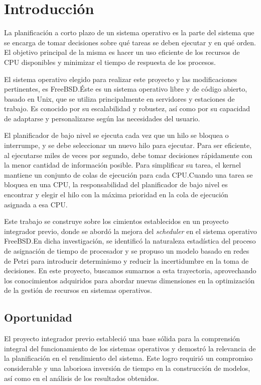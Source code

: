 \section{Introducción}
La planificación a corto plazo de un sistema operativo es la parte del sistema que se encarga de tomar decisiones sobre qué tareas se deben ejecutar y en qué orden. El objetivo principal de la misma es hacer un uso eficiente de los recursos de CPU disponibles y minimizar el tiempo de respuesta de los procesos.\par

El sistema operativo elegido para realizar este proyecto y las modificaciones pertinentes, es FreeBSD.\@ Éste es un sistema operativo libre y de código abierto, basado en Unix, que se utiliza principalmente en servidores y estaciones de trabajo. Es conocido por su escalabilidad y robustez, así como por su capacidad de adaptarse y personalizarse según las necesidades del usuario.\par

El planificador de bajo nivel se ejecuta cada vez que un hilo se bloquea o interrumpe, y se debe seleccionar un nuevo hilo para ejecutar. Para ser eficiente, al ejecutarse miles de veces por segundo, debe tomar decisiones rápidamente con la menor cantidad de información posible. Para simplificar su tarea, el kernel mantiene un conjunto de colas de ejecución para cada CPU.\@ Cuando una tarea se bloquea en una CPU, la responsabilidad del planificador de bajo nivel es encontrar y elegir el hilo con la máxima prioridad en la cola de ejecución asignada a esa CPU.\par

Este trabajo se construye sobre los cimientos establecidos en un proyecto integrador previo, donde se abordó la mejora del \textit{scheduler} en el sistema operativo FreeBSD.\@ En dicha investigación, se identificó la naturaleza estadística del proceso de asignación de tiempo de procesador y se propuso un modelo basado en redes de Petri para introducir determinismo y reducir la incertidumbre en la toma de decisiones. En este proyecto, buscamos sumarnos a esta trayectoria, aprovechando los conocimientos adquiridos para abordar nuevas dimensiones en la optimización de la gestión de recursos en sistemas operativos.\par

\subsection{Oportunidad}
El proyecto integrador previo estableció una base sólida para la comprensión integral del funcionamiento de los sistemas operativos y demostró la relevancia de la planificación en el rendimiento del sistema. Este logro requirió un compromiso considerable y una laboriosa inversión de tiempo en la construcción de modelos, así como en el análisis de los resultados obtenidos.\par

